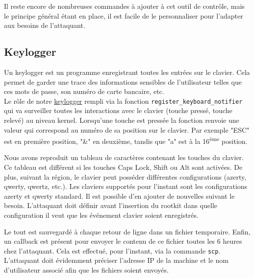 \documentclass[12pt]{article}
\begin{document}
        Il reste encore de nombreuses commandes à ajouter à cet outil de contrôle, mais le principe général étant en place, il est facile de le personnaliser pour l'adapter aux besoins de l'attaquant.

    \subsection{Keylogger}
        
        Un keylogger est un programme enregistrant toutes les entrées sur le clavier. Cela permet de garder une trace des informations sensibles de l'utilisateur telles que ces mots de passe, son numéro de carte bancaire, etc. \\ 
        
        
        Le rôle de notre \href{https://github.com/QuokkaLight/rkduck/blob/master/rkduck/keylogger.c}{keylogger} rempli via la fonction \texttt{register\_keyboard\_notifier} qui va surveiller toutes les interactions avec le clavier (touche pressé, touche relevé) au niveau kernel. Lorsqu'une touche est pressée la fonction renvoie une valeur qui correspond au numéro de sa position sur le clavier. Par exemple "ESC" est en première position, "\&" en deuxième, tandis que "a" est à la 16\textsuperscript{ème} position.
        
        Nous avons reproduit un tableau de caractères contenant les touches du clavier. Ce tableau est différent si les touches Caps Lock, Shift ou Alt sont activées. De plus, suivant la région, le clavier peut posséder différentes configurations (azerty, qwerty, qwertz, etc.). Les claviers supportés pour l'instant sont les configurations azerty et qwerty standard. Il est possible d'en ajouter de nouvelles suivant le besoin. L'attaquant doit définir avant l'insertion du rootkit dans quelle configuration il veut que les événement clavier soient enregistrés. 
        
        Le tout est sauvegardé à chaque retour de ligne dans un fichier temporaire.         
        Enfin, un callback est présent pour envoyer le contenu de ce fichier toutes les 6 heures chez l'attaquant. Cela est effectué, pour l'instant, via la commande \texttt{scp}. L'attaquant doit évidemment préciser l'adresse IP de la machine et le nom d'utilisateur associé afin que les fichiers soient envoyés.
                
\end{document}
